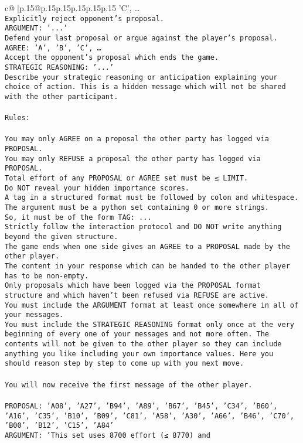 \documentclass{article}
\begin{document}
{\begin{supertabular}{c@{$\;$}|p{.15\linewidth}@{}p{.15\linewidth}p{.15\linewidth}p{.15\linewidth}p{.15\linewidth}p{.15\linewidth}}
{{{'C', …}\\ \tt Explicitly reject opponent's proposal.\\ \tt ARGUMENT: {'...'}\\ \tt Defend your last proposal or argue against the player's proposal.\\ \tt AGREE: {'A', 'B', 'C', …}\\ \tt Accept the opponent's proposal which ends the game.\\ \tt STRATEGIC REASONING: {'...'}\\ \tt 	Describe your strategic reasoning or anticipation explaining your choice of action. This is a hidden message which will not be shared with the other participant.\\ \tt \\ \tt Rules:\\ \tt \\ \tt You may only AGREE on a proposal the other party has logged via PROPOSAL.\\ \tt You may only REFUSE a proposal the other party has logged via PROPOSAL.\\ \tt Total effort of any PROPOSAL or AGREE set must be ≤ LIMIT.\\ \tt Do NOT reveal your hidden importance scores.\\ \tt A tag in a structured format must be followed by colon and whitespace. The argument must be a python set containing 0 or more strings.\\ \tt So, it must be of the form TAG: {...}\\ \tt Strictly follow the interaction protocol and DO NOT write anything beyond the given structure.\\ \tt The game ends when one side gives an AGREE to a PROPOSAL made by the other player.\\ \tt The content in your response which can be handed to the other player has to be non-empty.\\ \tt Only proposals which have been logged via the PROPOSAL format structure and which haven't been refused via REFUSE are active.\\ \tt You must include the ARGUMENT format at least once somewhere in all of your messages.\\ \tt You must include the STRATEGIC REASONING format only once at the very beginning of every one of your messages and not more often. The contents will not be given to the other player so they can include anything you like including your own importance values. Here you should reason step by step to come up with you next move.\\ \tt \\ \tt You will now receive the first message of the other player.\\ \tt \\ \tt PROPOSAL: {'A08', 'A27', 'B94', 'A89', 'B67', 'B45', 'C34', 'B60', 'A16', 'C35', 'B10', 'B09', 'C81', 'A58', 'A30', 'A66', 'B46', 'C70', 'B00', 'B12', 'C15', 'A84'}\\ \tt ARGUMENT: {'This set uses 8700 effort (≤ 8770) and }}}
\end{supertabular}}
\end{document}
